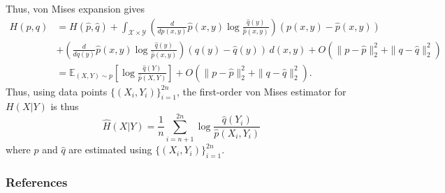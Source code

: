 \documentclass{article} %
\newcommand{\X}{\mathcal{X}}                        %
\newcommand{\Y}{\mathcal{Y}}                        %
\newcommand{\E}{\mathbb{E}}                         %
\renewcommand{\hat}{\widehat}
\begin{document}
Thus, von Mises expansion gives
\begin{align*}
H(p,q)
 &  = H(\hat p, \hat q)
    + \int_{\X \times \Y} \left( \frac{d}{dp(x,y)} \hat p(x,y)
        \log \frac{\hat q(y)}{\hat p(x,y)} \right) (p(x,y) - \hat p(x,y)) \\
 &  + \left( \frac{d}{dq(y)} \hat p(x,y)
            \log \frac{\hat q(y)}{\hat p(x,y)} \right) (q(y) - \hat q(y)) \, d(x,y)
    + O(\|p - \hat p\|_2^2 + \|q - \hat q\|_2^2)    \\
 &  = \E_{(X,Y) \sim p} \left[ \log \frac{\hat q(Y)}{\hat p(X,Y)} \right]
    + O(\|p - \hat p\|_2^2 + \|q - \hat q\|_2^2).
\end{align*}
Thus, using data points $\{(X_i,Y_i)\}_{i = 1}^{2n}$, the first-order von Mises
estimator for $H(X | Y)$ is thus
\[\hat H(X | Y)
    = \frac{1}{n} \sum_{i = n + 1}^{2n}
                                \log \frac{\hat q(Y_i)}{\hat p(X_i,Y_i)}\]
where $\hat p$ and $\hat q$ are estimated using $\{(X_i,Y_i)\}_{i = 1}^{2n}$.


\subsubsection*{References}
\setlength{\bibsep}{0.0pt}
{


}
\end{document}
